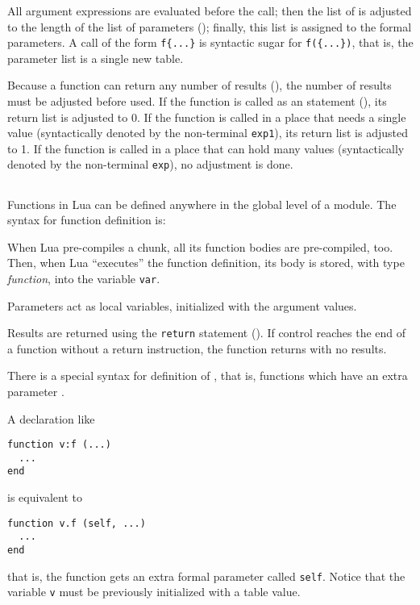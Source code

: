 \begin{Produc}
\end{Produc}%
All argument expressions are evaluated before the call;
then the list of  is adjusted to
the length of the list of parameters ();
finally, this list is assigned to the formal parameters.
A call of the form \verb'f{...}' is syntactic sugar for
\verb'f({...})', that is,
the parameter list is a single new table.

Because a function can return any number of results
(),
the number of results must be adjusted before used.
If the function is called as an statement (),
its return list is adjusted to 0.
If the function is called in a place that needs a single value
(syntactically denoted by the non-terminal \verb'exp1'),
its return list is adjusted to 1.
If the function is called in a place that can hold many values
(syntactically denoted by the non-terminal \verb'exp'),
no adjustment is done.


\subsection{}

Functions in Lua can be defined anywhere in the global level of a module.
The syntax for function definition is:
\begin{Produc}
\end{Produc}

When Lua pre-compiles a chunk,
all its function bodies are pre-compiled, too.
Then, when Lua ``executes'' the function definition,
its body is stored, with type {\em function},
into the variable \verb'var'.

Parameters act as local variables,
initialized with the argument values.
\begin{Produc}
\end{Produc}

Results are returned using the \verb'return' statement ().
If control reaches the end of a function without a return instruction,
the function returns with no results.

There is a special syntax for definition of ,
that is, functions which have an extra parameter .
\begin{Produc}
\end{Produc}%
A declaration like
\begin{verbatim}
function v:f (...)
  ...
end
\end{verbatim}
is equivalent to
\begin{verbatim}
function v.f (self, ...)
  ...
end
\end{verbatim}
that is, the function gets an extra formal parameter called \verb'self'.
Notice that
the variable \verb'v' must be previously initialized with a table value.


